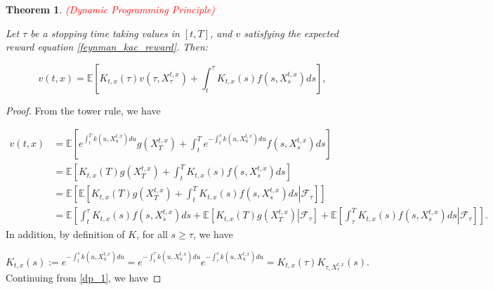 \documentclass{article}
\newtheorem{theorem}{Theorem}
\begin{document}
\begin{theorem} \label{thm:dp} \textcolor{red}{(Dynamic Programming Principle)}

Let $\tau$ be a stopping time taking values in $[t,T]$, and $v$ satisfying the expected reward equation \eqref{feynman_kac_reward}. Then:

\begin{equation}
v(t,x)=\mathbb{E}\left[K_{t,x}(\tau)v(\tau,X_\tau^{t,x})+\int^\tau_tK_{t,x}(s)f(s,X_s^{t,x})ds\right],
\end{equation}

\end{theorem}

\begin{proof}
From the tower rule, we have

\begin{equation} \label{dp_1}
\begin{aligned}
v(t,x)&=\mathbb{E}\left[e^{\int_t^Tk(u,X_u^{t,x})du}g(X_T^{t,x})+\int^T_te^{-\int^s_tk(u,X_u^{t,x})du}f(s,X_s^{t,x})ds\right]\\
&=\mathbb{E}\left[K_{t,x}(T)g(X_T^{t,x})+\int^T_tK_{t,x}(s)f(s,X_s^{t,x})ds\right]\\
&=\left.\mathbb{E}\left[\mathbb{E}\left[K_{t,x}(T)g(X_T^{t,x})+\int^T_tK_{t,x}(s)f(s,X_s^{t,x})ds\right\vert\mathcal{F}_\tau\right]\right]\\
&=\mathbb{E}\left[\int^\tau_tK_{t,x}(s)f(s,X_s^{t,x})ds+\left.\mathbb{E}\left[K_{t,x}(T)g(X_T^{t,x})\right\vert\mathcal{F}_\tau\right]+\left.\mathbb{E}\left[\int^T_\tau K_{t,x}(s)f(s,X_s^{t,x})ds\right\vert\mathcal{F}_\tau\right]\right].
\end{aligned}
\end{equation}
In addition, by definition of $K$, for all $s\geq \tau$, we have

\begin{equation*}
K_{t,x}(s):=e^{-\int^s_tk(u,X_u^{t,x})du}=e^{-\int^\tau_tk(u,X_u^{t,x})du}e^{-\int^s_\tau k(u,X_u^{t,x})du}=K_{t,x}(\tau)K_{\tau,X_\tau^{t,x}}(s).
\end{equation*}
Continuing from \eqref{dp_1}, we have


\end{proof}
\end{document}
